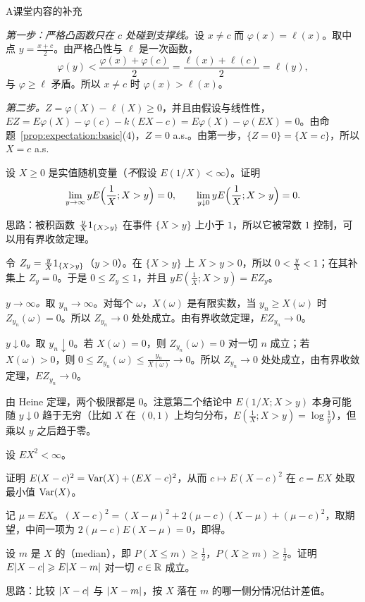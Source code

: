 \begin{exercises}{A}{课堂内容的补充}
\begin{solution}
\emph{第一步：严格凸函数只在 $c$ 处碰到支撑线。}设 $x\neq c$ 而 $\varphi(x)=\ell(x)$。取中点 $y=\frac{x+c}2$。由严格凸性与 $\ell$ 是一次函数，
\[
\varphi(y)<\frac{\varphi(x)+\varphi(c)}2=\frac{\ell(x)+\ell(c)}2=\ell(y),
\]
与 $\varphi\geqslant\ell$ 矛盾。所以 $x\neq c$ 时 $\varphi(x)>\ell(x)$。

\emph{第二步。}$Z=\varphi(X)-\ell(X)\geqslant0$，并且由假设与线性性，$EZ=E\varphi(X)-\varphi(c)-k(EX-c)=E\varphi(X)-\varphi(EX)=0$。由命题~\ref{prop:expectation:basic}(4)，$Z=0$ a.s.。由第一步，$\{Z=0\}=\{X=c\}$，所以 $X=c$ a.s.
\end{solution}

\item\label{ex:expectation:A7} 设 $X\geqslant0$ 是实值随机变量（\emph{不}假设 $E(1/X)<\infty$）。证明
\[
\lim_{y\to\infty}yE\Bigl(\frac1X;X>y\Bigr)=0,\qquad\lim_{y\downarrow0}yE\Bigl(\frac1X;X>y\Bigr)=0 .
\]
\begin{solution}
思路：被积函数 $\frac yX1_{\{X>y\}}$ 在事件 $\{X>y\}$ 上小于 $1$，所以它被常数 $1$ 控制，可以用有界收敛定理。

令 $Z_y=\frac yX1_{\{X>y\}}$（$y>0$）。在 $\{X>y\}$ 上 $X>y>0$，所以 $0<\frac yX<1$；在其补集上 $Z_y=0$。于是 $0\leqslant Z_y\leqslant1$，并且 $yE(\frac1X;X>y)=EZ_y$。

\emph{$y\to\infty$。}取 $y_n\to\infty$。对每个 $\omega$，$X(\omega)$ 是有限实数，当 $y_n\geqslant X(\omega)$ 时 $Z_{y_n}(\omega)=0$。所以 $Z_{y_n}\to0$ 处处成立。由有界收敛定理，$EZ_{y_n}\to0$。

\emph{$y\downarrow0$。}取 $y_n\downarrow0$。若 $X(\omega)=0$，则 $Z_{y_n}(\omega)=0$ 对一切 $n$ 成立；若 $X(\omega)>0$，则 $0\leqslant Z_{y_n}(\omega)\leqslant\frac{y_n}{X(\omega)}\to0$。所以 $Z_{y_n}\to0$ 处处成立，由有界收敛定理，$EZ_{y_n}\to0$。

由 Heine 定理，两个极限都是 $0$。注意第二个结论中 $E(1/X;X>y)$ 本身可能随 $y\downarrow0$ 趋于无穷（比如 $X$ 在 $(0,1)$ 上均匀分布，$E(\frac1X;X>y)=\log\frac1y$），但乘以 $y$ 之后趋于零。
\end{solution}

\item\label{ex:expectation:A8} 设 $EX^2<\infty$。
\begin{questions}
\item 证明 $E(X-c)^2=\operatorname{Var}(X)+(EX-c)^2$，从而 $c\mapsto E(X-c)^2$ 在 $c=EX$ 处取最小值 $\operatorname{Var}(X)$。
\begin{solution}
记 $\mu=EX$。$(X-c)^2=(X-\mu)^2+2(\mu-c)(X-\mu)+(\mu-c)^2$，取期望，中间一项为 $2(\mu-c)E(X-\mu)=0$，即得。
\end{solution}
\item 设 $m$ 是 $X$ 的（median），即 $P(X\leqslant m)\geqslant\frac12$，$P(X\geqslant m)\geqslant\frac12$。证明 $E\lvert X-c\rvert\geqslant E\lvert X-m\rvert$ 对一切 $c\in\mathbb{R}$ 成立。
\begin{solution}
思路：比较 $\lvert X-c\rvert$ 与 $\lvert X-m\rvert$，按 $X$ 落在 $m$ 的哪一侧分情况估计差值。


\end{solution}
\end{questions}
\end{exercises}
